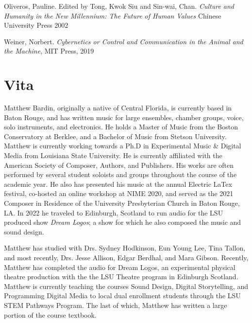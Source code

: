 \begin{thebibliography}{99}
 Oliveros, Pauline. Edited by Tong, Kwok Siu and Sin-wai, Chan. \emph{Culture and Humanity in the New Millennium: The Future of Human Values} Chinese University Press 2002

 Weiner, Norbert. \emph{Cybernetics or Control and Communication in the Animal and the Machine}, MIT Press, 2019




\end{thebibliography}


\chapter{Vita}

Matthew Bardin, originally a native of Central Florida, is currently based in Baton Rouge, and has written music for large ensembles, chamber groups, voice, solo instruments, and electronics. He holds a Master of Music from the Boston Conservatory at Berklee, and a  Bachelor of Music from Stetson University. Matthew is currently working towards a Ph.D in Experimental Music \& Digital Media from Louisiana State University. He is currently affiliated with the American Society of Composer, Authors, and Publishers. His works are often performed by several student soloists and groups throughout the course of the academic year. He also has presented his music at the annual Electric LaTex festival, co-hosted an online workshop at NIME 2020, and served as the 2021 Composer in Residence of the University Presbyterian Church in Baton Rouge, LA. In 2022 he traveled to Edinburgh, Scotland to run audio for the LSU produced show \textit{Dream Logos}; a show for which he also composed the music and sound design.

Matthew has studied with Drs. Sydney Hodkinson, Eun Young Lee, Tina Tallon, and most recently, Drs. Jesse Allison, Edgar Berdhal, and Mara Gibson. Recently, Matthew has completed the audio for Dream Logos, an experimental physical theatre production with the the LSU Theatre program in Edinburgh Scotland. Matthew is currently teaching the courses Sound Design, Digital Storytelling, and Programming Digital Media to local dual enrollment students through the LSU STEM Pathways Program. The last of which, Matthew has written a large portion of the course textbook.


